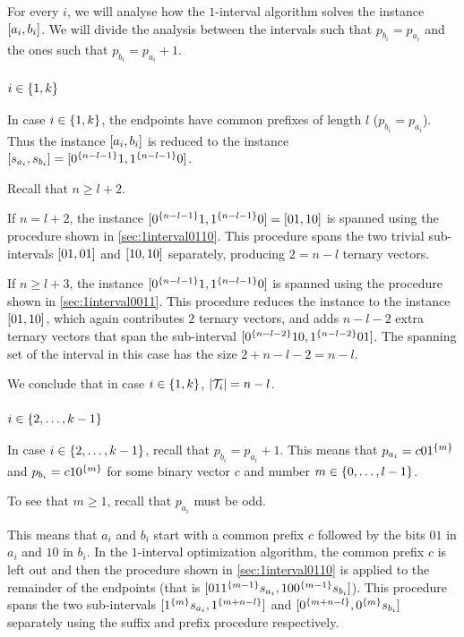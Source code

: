 For every $i$,
we will analyse how the $1$-interval algorithm solves
the instance $[a_i, b_i]$.
We will divide the analysis between the intervals
such that $p_{b_i} = p_{a_i}$
and the ones such that $p_{b_i} = p_{a_i} + 1$.

\subsubsection{$i \in \{1, k\}$}

In case $i \in \{1, k\}$,
the endpoints have common prefixes of length $l$
($p_{b_i} = p_{a_i}$).
Thus the instance $[a_i, b_i]$
is reduced to the instance
$[s_{a_i}, s_{b_i}]
= [0^{\{n-l-1\}} 1, 1^{\{n-l-1\}} 0]$.

Recall that $n \geq l + 2$.

If $n = l + 2$,
the instance
$[0^{\{n-l-1\}} 1, 1^{\{n-l-1\}} 0]
= [01, 10]$
is spanned using the procedure
shown in \autoref{sec:1interval0110}.
This procedure spans the two trivial sub-intervals
$[01, 01]$ and $[10, 10]$
separately,
producing $2 = n-l$ ternary vectors.

If $n \geq l + 3$,
the instance
$[0^{\{n-l-1\}} 1, 1^{\{n-l-1\}} 0]$
is spanned using the procedure
shown in \autoref{sec:1interval0011}.
This procedure reduces the instance
to the instance $[01, 10]$,
which again contributes $2$ ternary vectors,
and adds $n-l-2$ extra ternary vectors
that span the sub-interval
$[0^{\{n-l-2\}} 10, 1^{\{n-l-2\}} 01]$.
The spanning set of the interval in this case has the size
$2 + n - l - 2 = n - l$.

We conclude that in case $i \in \{1, k\}$,
$\lvert\mathcal{T}_i\rvert = n-l$.

\subsubsection{$i \in \{2, \ldots, k-1\}$}

In case $i \in \{2, \ldots, k-1\}$,
recall that $p_{b_i} = p_{a_i} + 1$.
This means that $p_{a_i} = c 0 1^{\{m\}}$
and $p_{b_i} = c 1 0^{\{m\}}$
for some binary vector $c$
and number $m \in \{0, \ldots, l-1\}$.

To see that $m \geq 1$,
recall that $p_{a_i}$ must be odd.

This means that $a_i$ and $b_i$
start with a common prefix $c$
followed by the bits $01$ in $a_i$
and $10$ in $b_i$.
In the $1$-interval optimization algorithm,
the common prefix $c$ is left out
and then the procedure
shown in \autoref{sec:1interval0110}
is applied to the remainder of the endpoints
(that is
$[01 1^{\{m-1\}} s_{a_i}, 10 0^{\{m-1\}} s_{b_i}]$).
This procedure spans the two sub-intervals
$[1^{\{m\}} s_{a_i}, 1^{\{m+n-l\}}]$
and $[0^{\{m+n-l\}}, 0^{\{m\}} s_{b_i}]$
separately using the suffix and prefix procedure
respectively.

